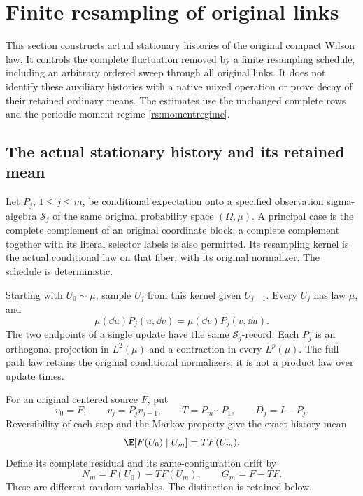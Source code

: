 \section{Finite resampling of original links}
\label{wh:section}

This section constructs actual stationary histories of the original compact Wilson law. It controls the complete fluctuation removed by a finite resampling schedule, including an arbitrary ordered sweep through all original links. It does not identify these auxiliary histories with a native mixed operation or prove decay of their retained ordinary means. The estimates use the unchanged complete rows and the periodic moment regime \eqref{rs:momentregime}.

\subsection{The actual stationary history and its retained mean}

Let \(P_j\), \(1\le j\le m\), be conditional expectation onto a specified observation sigma-algebra \(\mathcal S_j\) of the same original probability space \((\Omega,\mu)\). A principal case is the complete complement of an original coordinate block; a complete complement together with its literal selector labels is also permitted. Its resampling kernel is the actual conditional law on that fiber, with its original normalizer. The schedule is deterministic.

Starting with \(U_0\sim\mu\), sample \(U_j\) from this kernel given \(U_{j-1}\). Every \(U_j\) has law \(\mu\), and
\[
 \mu(\dd u)P_j(u,\dd v)=\mu(\dd v)P_j(v,\dd u).
\]
The two endpoints of a single update have the same \(\mathcal S_j\)-record. Each \(P_j\) is an orthogonal projection in \(L^2(\mu)\) and a contraction in every \(L^p(\mu)\). The full path law retains the original conditional normalizers; it is not a product law over update times.

For an original centered source \(F\), put
\[
 v_0=F,\qquad v_j=P_jv_{j-1},\qquad
 T=P_m\cdots P_1,\qquad D_j=I-P_j.
\]
Reversibility of each step and the Markov property give the exact history mean
\begin{equation}
 \E[F(U_0)\mid U_m]=TF(U_m).
 \label{wh:mean}
\end{equation}
Define its complete residual and its same-configuration drift by
\[
 N_m=F(U_0)-TF(U_m),\qquad G_m=F-TF.
\]
These are different random variables. The distinction is retained below.

